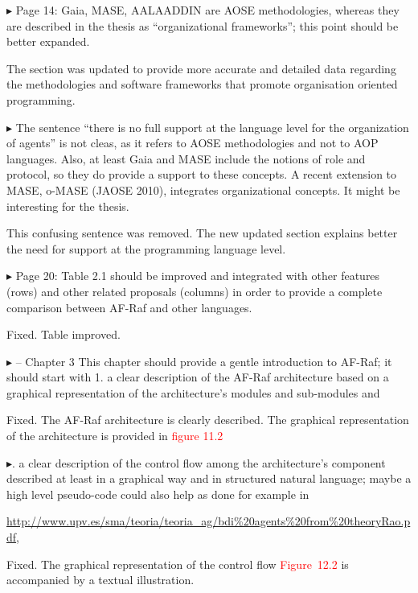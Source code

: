 \documentclass{article}
\newcommand*\R[1]{\textcolor{red}{#1}} %
\newenvironment{them}%
  {\bigskip\noindent\begingroup\color{blue}$\blacktriangleright$\enspace}%
  {\endgroup\par}
\begin{document}
\begin{them}
Page 14:
Gaia, MASE, AALAADDIN are AOSE methodologies, whereas they are described in the
thesis as ``organizational frameworks''; this point should be better expanded.
\end{them}
The section was updated to provide more accurate and detailed data regarding
the methodologies and software frameworks that promote organisation oriented
programming.

\begin{them}
The sentence ``there is no full support at the language level for the
organization of agents'' is not cleas, as it refers to AOSE methodologies and
not to AOP languages. Also, at least Gaia and MASE include the notions of role
and protocol, so they do provide a support to these concepts. A recent
extension to MASE, o-MASE (JAOSE 2010), integrates organizational concepts. It
might be interesting for the thesis.
\end{them}
This confusing sentence was removed. The new updated section explains better
the need for support at the programming language level. 

\begin{them}
Page 20:
Table 2.1 should be improved and integrated with other features (rows) and
other related proposals (columns) in order to provide a complete comparison
between AF-Raf and other languages.
\end{them}
Fixed. Table improved.

\begin{them}
-- Chapter 3
This chapter should provide a gentle introduction to AF-Raf; it should start
with 1. a clear description of the AF-Raf architecture based on a graphical
representation of the architecture's modules and sub-modules and
\end{them}
Fixed. The AF-Raf architecture is clearly described. The graphical
representation of the architecture is provided in \R{figure 11.2}

\begin{them}
2. a clear description of the control flow among the architecture's component
described at least in a graphical way and in structured natural language; maybe
a high level pseudo-code could also help as done for example in

\url{http://www.upv.es/sma/teoria/teoria_ag/bdi\%20agents\%20from\%20theoryRao.pdf},
\end{them}
Fixed. The graphical representation of the control flow \R{Figure~12.2} is
accompanied by a textual illustration.
\end{document}
